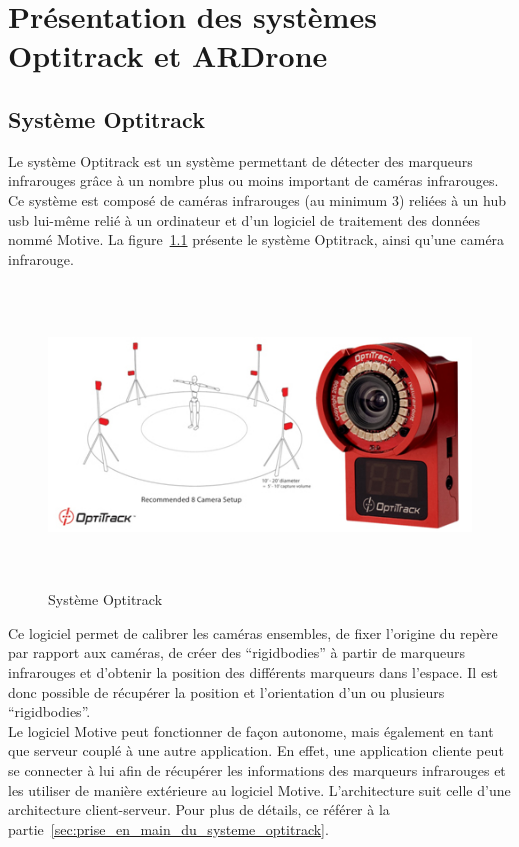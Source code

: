 \chapter{Présentation des systèmes Optitrack et ARDrone}

    \section{Système Optitrack}
        Le système Optitrack est un système permettant de détecter des marqueurs infrarouges grâce à un nombre plus ou moins important de caméras infrarouges. Ce système est composé de caméras infrarouges (au minimum 3) reliées à un hub usb lui-même relié à un ordinateur et d'un logiciel de traitement des données nommé Motive. La figure~\ref{fig:systeme_optitrack} présente le système Optitrack, ainsi qu'une caméra infrarouge.

        \begin{figure}[h]
          \centering
          \includegraphics[height=8cm]{images/optitrack_systeme.jpg}
          \caption{Système Optitrack}
          \label{fig:systeme_optitrack}
        \end{figure}

        Ce logiciel permet de calibrer les caméras ensembles, de fixer l'origine du repère par rapport aux caméras, de créer des ``rigidbodies'' à partir de marqueurs infrarouges et d'obtenir la position des différents marqueurs dans l'espace. Il est donc possible de récupérer la position et l'orientation d'un ou plusieurs ``rigidbodies''. \\

        Le logiciel Motive peut fonctionner de façon autonome, mais également en tant que serveur couplé à une autre application. En effet, une application cliente peut se connecter à lui afin de récupérer les informations des marqueurs infrarouges et les utiliser de manière extérieure au logiciel Motive. L'architecture suit celle d'une architecture client-serveur. Pour plus de détails, ce référer à la partie~\ref{sec:prise_en_main_du_systeme_optitrack}.


